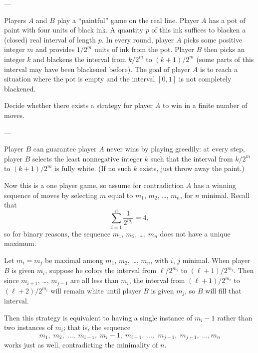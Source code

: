 
---

Players $A$ and $B$ play a ``paintful'' game on the real line. Player $A$ has a pot of paint with four units of black ink. A quantity $p$ of this ink suffices to blacken a (closed) real interval of length $p$. In every round, player $A$ picks some positive integer $m$ and provides $1/2^m$ units of ink from the pot. Player $B$ then picks an integer $k$ and blackens the interval from $k/2^m$ to $(k+1)/2^m$ (some parts of this interval may have been blackened before). The goal of player $A$ is to reach a situation where the pot is empty and the interval $[0,1]$ is not completely blackened.

Decide whether there exists a strategy for player $A$ to win in a finite number of moves.

---

Player $B$ can guarantee player $A$ never wins by playing greedily: at every step, player $B$ selects the least nonnegative integer $k$ such that the interval from $k/2^m$ to $(k+1)/2^m$ is fully white. (If no such $k$ exists, just throw away the paint.)

Now this is a one player game, so assume for contradiction $A$ has a winning sequence of moves by selecting $m$ equal to $m_1$, $m_2$, \ldots, $m_n$, for $n$ minimal. Recall that
\[\sum_{i=1}^n\frac1{2^{m_i}}=4,\]
so for binary reasons, the sequence $m_1$, $m_2$, \ldots, $m_n$ does not have a unique maximum.

Let $m_i=m_j$ be maximal among $m_1$, $m_2$, \ldots, $m_n$, with $i$, $j$ minimal. When player $B$ is given $m_i$, suppose he colors the interval from $\ell/2^{m_i}$ to $(\ell+1)/2^{m_i}$. Then since $m_{i+1}$, \ldots, $m_{j-1}$ are all less than $m_i$, the interval from $(\ell+1)/2^{m_i}$ to $(\ell+2)/2^{m_i}$ will remain white until player $B$ is given $m_j$, so $B$ will fill that interval.

Then this strategy is equivalent to having a single instance of $m_i-1$ rather than two instances of $m_i$; that is, the sequence
\[m_1,\;m_2,\;\ldots,\;m_{i-1},\;m_i-1,\;m_{i+1},\;\ldots,\;m_{j-1},\;m_{j+1},\;\ldots,m_n\]
works just as well, contradicting the minimality of $n$.

